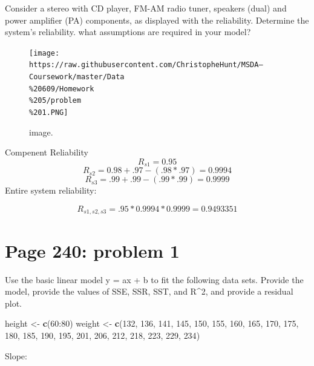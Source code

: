 \documentclass[]{article}
\newenvironment{Shaded}{\begin{snugshade}}{\end{snugshade}}
\newcommand{\KeywordTok}[1]{\textcolor[rgb]{0.13,0.29,0.53}{\textbf{{#1}}}}
\newcommand{\DecValTok}[1]{\textcolor[rgb]{0.00,0.00,0.81}{{#1}}}
\newcommand{\StringTok}[1]{\textcolor[rgb]{0.31,0.60,0.02}{{#1}}}
\newcommand{\NormalTok}[1]{{#1}}
\begin{document}
Consider a stereo with CD player, FM-AM radio tuner, speakers (dual) and
power amplifier (PA) components, as displayed with the reliability.
Determine the system's reliability. what assumptions are required in
your model?

\begin{figure}[htbp]
\centering
\texttt{[image: https://raw.githubusercontent.com/ChristopheHunt/MSDA---Coursework/master/Data\\\%20609/Homework\\\%205/problem\\\%201.PNG]}
\caption{image.}
\end{figure}

Compenent Reliability \[R_{s1} = 0.95\]
\[R_{s2} = 0.98 + .97 - (.98 * .97) = 0.9994\]
\[R_{s3} = .99 + .99 - (.99 * .99) = 0.9999\] Entire system reliability:

\[R_{s1, s2, s3} = .95 * 0.9994 * 0.9999 = 0.9493351\] \newpage

\section{Page 240: problem 1}\label{page-240-problem-1}

Use the basic linear model y = ax + b to fit the following data sets.
Provide the model, provide the values of SSE, SSR, SST, and R\^{}2, and
provide a residual plot.

\begin{Shaded}
\begin{Highlighting}[]
\NormalTok{height <-}\StringTok{ }\KeywordTok{c}\NormalTok{(}\DecValTok{60}\NormalTok{:}\DecValTok{80}\NormalTok{)}
\NormalTok{weight <-}\StringTok{ }\KeywordTok{c}\NormalTok{(}\DecValTok{132}\NormalTok{, }\DecValTok{136}\NormalTok{, }\DecValTok{141}\NormalTok{, }\DecValTok{145}\NormalTok{, }\DecValTok{150}\NormalTok{, }\DecValTok{155}\NormalTok{, }\DecValTok{160}\NormalTok{, }\DecValTok{165}\NormalTok{, }\DecValTok{170}\NormalTok{, }
            \DecValTok{175}\NormalTok{, }\DecValTok{180}\NormalTok{, }\DecValTok{185}\NormalTok{, }\DecValTok{190}\NormalTok{, }\DecValTok{195}\NormalTok{, }\DecValTok{201}\NormalTok{, }\DecValTok{206}\NormalTok{, }\DecValTok{212}\NormalTok{, }\DecValTok{218}\NormalTok{, }
            \DecValTok{223}\NormalTok{, }\DecValTok{229}\NormalTok{, }\DecValTok{234}\NormalTok{)}
\end{Highlighting}
\end{Shaded}

Slope:
\end{document}
